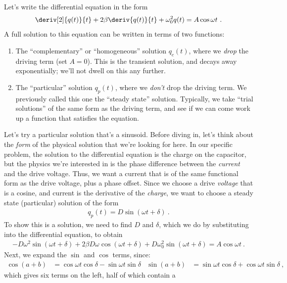 \documentclass[12pt]{article}
\begin{document}
Let's write the differential equation in the form
\begin{gather*}
  \deriv[2]{q(t)}{t} + 2 \beta \deriv{q(t)}{t} + \omega_0^2 q(t) = A
  \cos\omega t\ .
\end{gather*}
A full solution to this equation can be written in terms of two
functions: 
\begin{enumerate}
\item The ``complementary'' or ``homogeneous'' solution $q_c(t)$,
  where we \textit{drop} the driving term (set $A=0$).  This is the
  transient solution, and decays away exponentially; we'll not dwell
  on this any further.
\item The ``particular'' solution $q_p(t)$, where we \textit{don't}
  drop the driving term.  We previously called this one the ``steady
  state'' solution.  Typically, we take ``trial solutions'' of the
  same form as the driving term, and see if we can come work up a
  function that satisfies the equation.
\end{enumerate}
Let's try a particular solution that's a sinusoid.  Before diving in,
let's think about the \textit{form} of the physical solution that
we're looking for here.  In our specific problem, the solution to the
differential equation is the charge on the capacitor, but the physics
we're interested in is the phase difference between the
\textit{current} and the drive voltage.  Thus, we want a current that
is of the same functional form as the drive voltage, plus a phase
offset.  Since we choose a drive \textit{voltage} that is a cosine,
and current is the derivative of the \textit{charge}, we want to
choose a steady state (particular) solution of the form
\begin{gather*}
  q_p(t) = D \sin\left( \omega t + \delta \right)\ .
\end{gather*}
To show this is a solution, we need to find $D$ and $\delta$, which we
do by substituting into the differential equation, to obtain
\begin{gather*}
  -D\omega^2 \sin\left(\omega t + \delta\right) + 2\beta D\omega
  \cos\left(\omega t + \delta\right) + D\omega_0^2 \sin\left(\omega t
    + \delta\right) = A \cos\omega t\ .
\end{gather*}
Next, we expand the $\sin$ and $\cos$ terms, since:
\begin{align*}
  \cos(a+b) &= \cos\omega t \cos\delta - \sin\omega t \sin\delta &
  \sin(a+b) &= \sin\omega t \cos\delta + \cos\omega t \sin\delta\ ,
\end{align*}
which gives six terms on the left, half of which contain a
\end{document}
